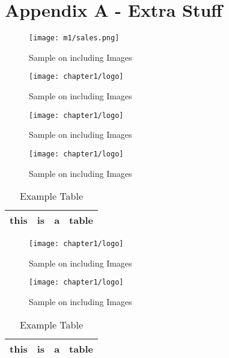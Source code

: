 \Appendix

\section*{Appendix A - Extra Stuff}

\begin{figure}[!ht]
	\centering
	\texttt{[image: m1/sales.png]}
	\label{fig:sales}\caption{Sample on including Images}
\end{figure}

\begin{figure}[!ht]
	\centering
	\texttt{[image: chapter1/logo]}
	\label{fig:sales}\caption{Sample on including Images}
\end{figure}
\begin{figure}[!ht]
	\centering
	\texttt{[image: chapter1/logo]}
	\label{fig:sales}\caption{Sample on including Images}
\end{figure}
\begin{figure}[!ht]
	\centering
	\texttt{[image: chapter1/logo]}
	\label{fig:sales}\caption{Sample on including Images}
\end{figure}




\begin{table}[!ht]
	\begin{center}
		\label{tble:example}\caption{Example Table}
		\begin{tabular}{|c | c | c | c|}
			\hline
			this & is & a & table \\ \hline
		\end{tabular}
	\end{center}
\end{table}


\begin{figure}[!ht]
	\centering
	\texttt{[image: chapter1/logo]}
	\label{fig:sales}\caption{Sample on including Images}
\end{figure}

\begin{figure}[!ht]
	\centering
	\texttt{[image: chapter1/logo]}
	\label{fig:sales}\caption{Sample on including Images}
\end{figure}



\begin{table}[!ht]
	\begin{center}
		\label{tble:example}\caption{Example Table}
		\begin{tabular}{|c | c | c | c|}
			\hline
			this & is & a & table \\ \hline
		\end{tabular}
	\end{center}
\end{table}


